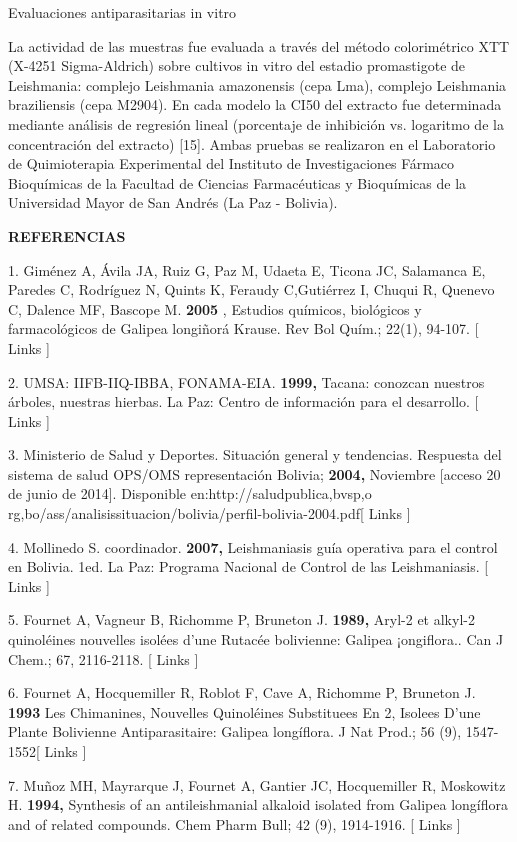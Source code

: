 \documentclass{article}
\begin{document}
Evaluaciones antiparasitarias in vitro

La actividad de las muestras fue evaluada a través del método colorimétrico XTT
(X-4251 Sigma-Aldrich) sobre cultivos in vitro del estadio promastigote de
Leishmania: complejo Leishmania amazonensis (cepa Lma), complejo Leishmania
braziliensis (cepa M2904). En cada modelo la CI50 del extracto fue determinada
mediante análisis de regresión lineal (porcentaje de inhibición vs. logaritmo de
la concentración del extracto) [15]. Ambas pruebas se realizaron en el
Laboratorio de Quimioterapia Experimental del Instituto de Investigaciones
Fármaco Bioquímicas de la Facultad de Ciencias Farmacéuticas y Bioquímicas de la
Universidad Mayor de San Andrés (La Paz - Bolivia).

\textbf{REFERENCIAS}

1. Giménez A, Ávila JA, Ruiz G, Paz M, Udaeta E, Ticona JC, Salamanca E, Paredes
C, Rodríguez N, Quints K, Feraudy C,Gutiérrez I, Chuqui R, Quenevo C, Dalence
MF, Bascope M. \textbf{2005}
, Estudios químicos, biológicos y farmacológicos de Galipea longiñorá Krause.
Rev Bol Quím.; 22(1), 94-107. [ Links ]

2. UMSA: IIFB-IIQ-IBBA, FONAMA-EIA. \textbf{1999, }
Tacana: conozcan nuestros árboles, nuestras hierbas. La Paz: Centro de
información para el desarrollo. [ Links ]

3. Ministerio de Salud y Deportes. Situación general y tendencias. Respuesta del
sistema de salud OPS/OMS representación Bolivia; \textbf{2004, }
Noviembre [acceso 20 de junio de 2014]. Disponible en:http://saludpublica,bvsp,o
rg,bo/ass/analisissituacion/bolivia/perfil-bolivia-2004.pdf[ Links ]

4. Mollinedo S. coordinador. \textbf{2007, }
Leishmaniasis guía operativa para el control en Bolivia. 1ed. La Paz: Programa
Nacional de Control de las Leishmaniasis. [ Links ]

5. Fournet A, Vagneur B, Richomme P, Bruneton J. \textbf{1989, }
Aryl-2 et alkyl-2 quinoléines nouvelles isolées d'une Rutacée bolivienne:
Galipea ¡ongiflora.. Can J Chem.; 67, 2116-2118. [ Links ]

6. Fournet A, Hocquemiller R, Roblot F, Cave A, Richomme P, Bruneton J.
\textbf{1993 }
Les Chimanines, Nouvelles Quinoléines Substituees En 2, Isolees D'une Plante
Bolivienne Antiparasitaire: Galipea longíflora. J Nat Prod.; 56 (9), 1547-1552[
Links ]

7. Muñoz MH, Mayrarque J, Fournet A, Gantier JC, Hocquemiller R, Moskowitz H.
\textbf{1994, }
Synthesis of an antileishmanial alkaloid isolated from Galipea longíflora and of
related compounds. Chem Pharm Bull; 42 (9), 1914-1916. [ Links ]
\end{document}
